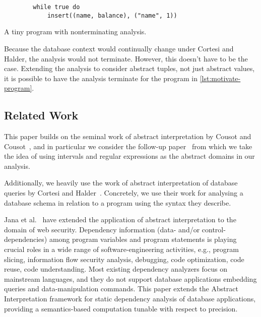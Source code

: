 \begin{listing}
    \begin{verbatim}
        while true do
            insert((name, balance), ("name", 1))
    \end{verbatim}
    \caption{A tiny program with nonterminating analysis.}
    \label{lst:motivate-program}
\end{listing}


Because the database context would continually change under Cortesi and Halder, the analysis would not terminate.
However, this doesn't have to be the case.
Extending the analysis to consider abstract tuples, not just abstract values, it is possible to have the analysis terminate for the program in \autoref{lst:motivate-program}.


\subsection{Related Work}\label{subsec:related-work}
This paper builds on the seminal work of abstract interpretation by Cousot and Cousot~\cite{cousot_abstract_1977}, and in particular we consider the follow-up paper~\cite{cousot_abstract_1996} from which we take the idea of using intervals and regular expressions as the abstract domains in our analysis.

Additionally, we heavily use the work of abstract interpretation of database queries by Cortesi and Halder~\cite{halder_abstract_2012}.
Concretely, we use their work for analysing a database schema in relation to a program using the syntax they describe.

Jana et al.~\cite{jana_extending_2020} have extended the application of abstract interpretation to the domain of web security. 
Dependency information (data- and/or control-dependencies) among program variables and program statements is playing crucial roles in a wide range of software-engineering activities, e.g., program slicing, information flow security analysis, debugging, code optimization, code reuse, code understanding.
Most existing dependency analyzers focus on mainstream languages, and they do not support database applications embedding queries and data-manipulation commands.
This paper extends the Abstract Interpretation framework for static dependency analysis of database applications, providing a semantics-based computation tunable with respect to precision.

